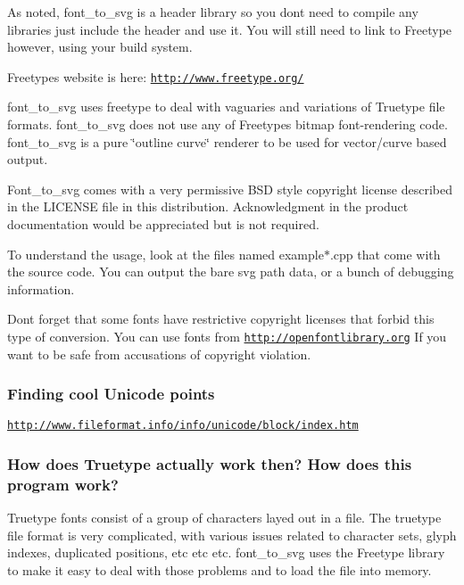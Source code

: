 As noted, font\+\_\+to\+\_\+svg is a \textquotesingle{}header library\textquotesingle{} so you dont need to compile any libraries just include the header and use it. You will still need to link to Freetype however, using your build system.

Freetype\textquotesingle{}s website is here\+: \href{http://www.freetype.org/}{\tt http\+://www.\+freetype.\+org/}

font\+\_\+to\+\_\+svg uses freetype to deal with vaguaries and variations of Truetype file formats. font\+\_\+to\+\_\+svg does not use any of Freetype\textquotesingle{}s bitmap font-\/rendering code. font\+\_\+to\+\_\+svg is a pure \char`\"{}outline curve\char`\"{} renderer to be used for vector/curve based output.

Font\+\_\+to\+\_\+svg comes with a very permissive B\+SD style copyright license described in the L\+I\+C\+E\+N\+SE file in this distribution. Acknowledgment in the product documentation would be appreciated but is not required.

To understand the usage, look at the files named \textquotesingle{}example$\ast$.cpp\textquotesingle{} that come with the source code. You can output the bare svg path data, or a bunch of debugging information.

Don\textquotesingle{}t forget that some fonts have restrictive copyright licenses that forbid this type of conversion. You can use fonts from \href{http://openfontlibrary.org}{\tt http\+://openfontlibrary.\+org} If you want to be safe from accusations of copyright violation.

\subsubsection*{Finding cool Unicode points}

\href{http://www.fileformat.info/info/unicode/block/index.htm}{\tt http\+://www.\+fileformat.\+info/info/unicode/block/index.\+htm}

\subsubsection*{How does Truetype actually work then? How does this program work?}

Truetype fonts consist of a group of characters layed out in a file. The truetype file format is very complicated, with various issues related to character sets, glyph indexes, duplicated positions, etc etc etc. font\+\_\+to\+\_\+svg uses the Freetype library to make it easy to deal with those problems and to load the file into memory.

